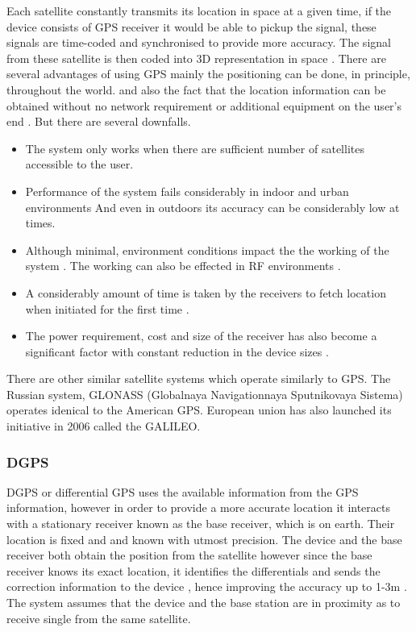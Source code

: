 \documentclass[12pt]{report}
\begin{document}
Each satellite constantly transmits its location in space at a given time, if the device consists of GPS receiver 
it would be able to pickup the signal, these signals are time-coded and synchronised to provide more accuracy. The signal from these satellite is then coded into 3D representation in space \cite{djuknic2001geolocation}. There are several advantages of using GPS mainly the positioning can be done, in principle, throughout the world. and also the fact that the location information can be obtained without no network requirement or additional equipment on the user's end \cite{djuknic2001geolocation}. But there are several downfalls.


\begin{itemize}
\item The system only works when there are sufficient number of satellites accessible to the user.

\item Performance of the system fails considerably in indoor and urban environments \cite{hazas2004location} And even in outdoors its accuracy can be considerably low at times.

\item Although minimal, environment conditions impact the the working of the system \cite{schiller2004location}. The working can also be effected in RF environments \cite{djuknic2001geolocation}.

\item A considerably amount of time is taken by the receivers to fetch location when initiated for the first time \cite{hazas2004location}.

\item The power requirement, cost and size of the receiver has also become a significant factor with constant reduction in the device sizes \cite{djuknic2001geolocation}.
\end{itemize}

There are other similar satellite systems which operate similarly to GPS. The Russian system, GLONASS (Globalnaya Navigationnaya Sputnikovaya Sistema) operates idenical to the American GPS. European union has also launched its initiative in 2006 called the GALILEO.


\subsubsection{DGPS}
DGPS or differential GPS uses the available information from the GPS information, however in order to provide a more accurate location it interacts with a stationary receiver known as the base receiver, which is on earth. Their location is fixed and and known with utmost precision. The device and the base receiver both obtain the position from the satellite however since the base receiver knows its exact location, it identifies the differentials and sends the correction information to the device \cite{roth2002mobile}, hence improving the accuracy up to 1-3m \cite{schiller2004location}. The system assumes that the device and the base station are in proximity as to receive single from the same satellite. 
\end{document}
